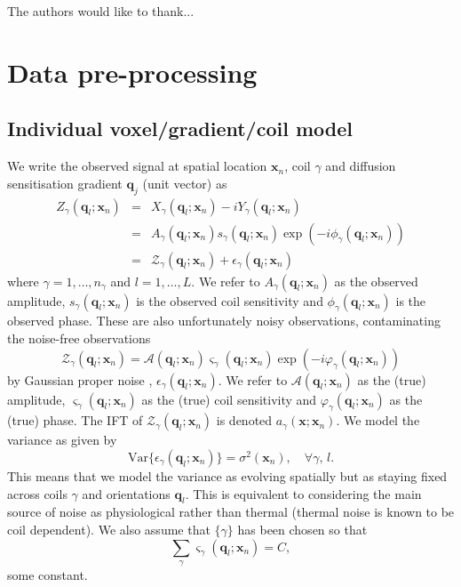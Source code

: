 \documentclass[authoryear,preprint,12pt]{elsarticle}
\newcommand{\var}{\text{Var}}
\newcommand{\q}{\mathbf{q}}
\newcommand{\x}{\mathbf{x}}
\newcommand{\cA}{\mathcal{A}}
\newcommand{\cZ}{\mathcal{Z}}
\newcommand{\eps}{\epsilon}
\begin{document}
The authors would like to thank...

\appendix

\section{Data pre-processing}
\label{preprocessing:step1}

\subsection{Individual voxel/gradient/coil model}
\label{modelA1}

We write the observed signal at spatial location $\x_n$, coil $\gamma$
and diffusion sensitisation gradient $\q_j$ (unit vector) as
\begin{eqnarray}
  Z_{\gamma}(\q_l;\x_n) &=& X_{\gamma}(\q_l;\x_n) - i Y_{\gamma}(\q_l;\x_n)\\
  &=& A_{\gamma}(\q_l;\x_n) s_{\gamma}(\q_l;\x_n)
  \exp\left(-i\phi_{\gamma}(\q_l;\x_n)\right)\\
  &=&\cZ_{\gamma}(\q_l;\x_n)+\eps_{\gamma}(\q_l;\x_n)
\end{eqnarray} 
where $\gamma=1,\dots,n_{\gamma}$ and $l=1,\dots,L$.  We refer to
$A_{\gamma}(\q_l;\x_n)$ as the observed amplitude, $s_{\gamma}(\q_l;\x_n)$
is the observed coil sensitivity and $\phi_{\gamma}(\q_l;\x_n)$ is the
observed phase.
These are also unfortunately noisy observations, contaminating the
noise-free observations
\begin{equation}
\cZ_{\gamma}(\q_l;\x_n)=\cA(\q_l;\x_n)\varsigma_{\gamma}(\q_l;\x_n)
\exp\left(-i\varphi_{\gamma}(\q_l;\x_n)\right)
\end{equation} 
by Gaussian proper noise \citep{Picinbono1996},
$\eps_{\gamma}(\q_l;\x_n)$.  We refer to $\cA(\q_l;\x_n)$ as the
(true) amplitude, $\varsigma_{\gamma}(\q_l;\x_n)$ as the (true) coil
sensitivity and $\varphi_{\gamma}(\q_l;\x_n)$ as the (true) phase.
The IFT of $\cZ_{\gamma}(\q_l;\x_n)$ is denoted $a_{\gamma}(\x;\x_n)$.
We model the variance as given by
\begin{equation}
  \var\{\eps_{\gamma}(\q_l;\x_n)\}=\sigma^2(\x_n), \quad \forall \gamma,\,l.
\end{equation}
This means that we model the variance as evolving spatially but as
staying fixed across coils $\gamma$ and orientations ${\q}_l$.  This
is equivalent to considering the main source of noise as physiological
rather than thermal (thermal noise is known to be coil dependent).  We
also assume that $\{\gamma\}$ has been chosen so that
\begin{equation}
\sum_{\gamma} \varsigma_{\gamma}(\q_l;\x_n)=C,
\end{equation}
some constant.
\end{document}
